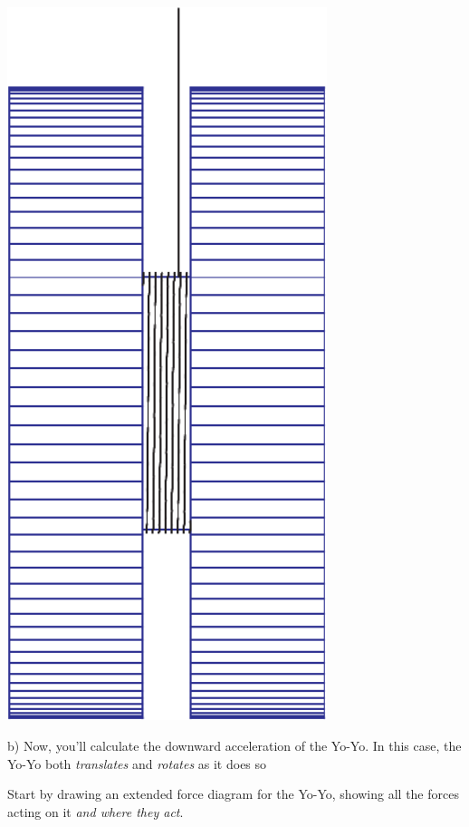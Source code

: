 \documentclass[12pt]{article}
\begin{document}
\begin{minipage}{0.20  \textwidth}
		\begin{center}
	\includegraphics[width=0.7\textwidth]{blue-crop.pdf}
		\end{center}
\end{minipage}


\vspace{1.5in}

b) Now, you'll calculate the downward acceleration of the Yo-Yo. In this case, the Yo-Yo both {\it translates} and {\it rotates} as it does so

Start by drawing an extended force diagram for the Yo-Yo, showing all the forces acting on it {\it and where they act}.
\end{document}
